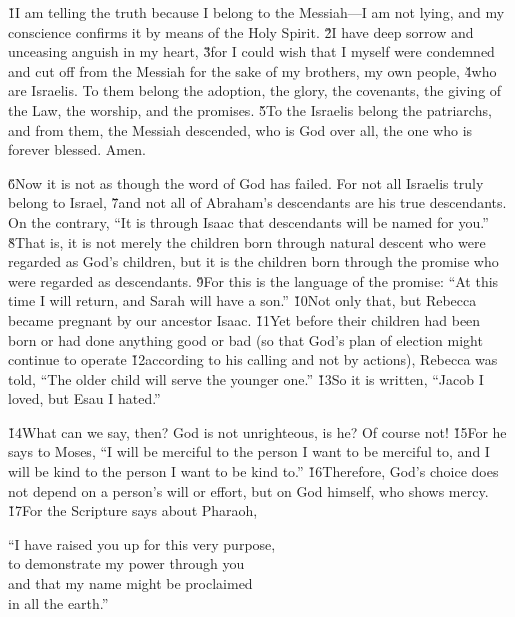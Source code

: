 \v{1}I am telling the truth because I belong to the Messiah---I am not lying, and my conscience confirms it by means of the Holy Spirit. \v{2}I have deep sorrow and unceasing anguish in my heart, \v{3}for I could wish that I myself were condemned and cut off from the Messiah for the sake of my brothers, my own people, \v{4}who are Israelis. To them belong the adoption, the glory, the covenants, the giving of the Law, the worship, and the promises. \v{5}To the Israelis belong the patriarchs, and from them, the Messiah descended, who is God over all, the one who is forever blessed. Amen.

\v{6}Now it is not as though the word of God has failed. For not all Israelis truly belong to Israel, \v{7}and not all of Abraham's descendants are his true descendants. On the contrary, ``It is through Isaac that descendants will be named for you.'' \v{8}That is, it is not merely the children born through natural descent who were regarded as God's children, but it is the children born through the promise who were regarded as descendants. \v{9}For this is the language of the promise: ``At this time I will return, and Sarah will have a son.'' \v{10}Not only that, but Rebecca became pregnant by our ancestor Isaac. \v{11}Yet before their children had been born or had done anything good or bad (so that God's plan of election might continue to operate \v{12}according to his calling and not by actions), Rebecca was told, ``The older child will serve the younger one.'' \v{13}So it is written, ``Jacob I loved, but Esau I hated.''

\v{14}What can we say, then? God is not unrighteous, is he? Of course not! \v{15}For he says to Moses, ``I will be merciful to the person I want to be merciful to, and I will be kind to the person I want to be kind to.'' \v{16}Therefore, God's choice does not depend on a person's will or effort, but on God himself, who shows mercy. \v{17}For the Scripture says about Pharaoh,

\begin{poetry}
\poeml ``I have raised you up for this very purpose, \\
\poemll    to demonstrate my power through you \\
\poeml and that my name might be proclaimed \\
\poemll    in all the earth.''
\end{poetry}

